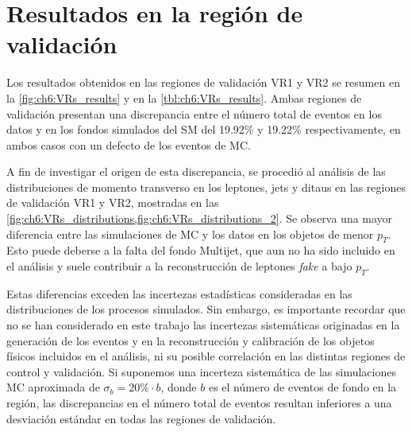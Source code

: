 \section{Resultados en la región de validación}

Los resultados obtenidos en las regiones de validación VR1 y VR2 se resumen en la \cref{fig:ch6:VRs_results} y en la \cref{tbl:ch6:VRs_results}. Ambas regiones de validación presentan una discrepancia entre el número total de eventos en los datos y en los fondos simulados del SM del 19.92\% y 19.22\% respectivamente, en ambos casos con un defecto de los eventos de MC.

A fin de investigar el origen de esta discrepancia, se procedió al análisis de las distribuciones de momento transverso en los leptones, jets y ditaus en las regiones de validación VR1 y VR2, mostradas en las \cref{fig:ch6:VRs_distributions,fig:ch6:VRs_distributions_2}. Se observa una mayor diferencia entre las simulaciones de MC y los datos en los objetos de menor $p_T$. Esto puede deberse a la falta del fondo Multijet, que aun no ha sido incluido en el análisis y suele contribuir a la reconstrucción de leptones \textit{fake} a bajo $p_T$.

Estas diferencias exceden las incertezas estadísticas consideradas en las distribuciones de los procesos simulados. Sin embargo, es importante recordar que no se han considerado en este trabajo las incertezas sistemáticas originadas en la generación de los eventos y en la reconstrucción y calibración de los objetos físicos incluidos en el análisis, ni su posible correlación en las distintas regiones de control y validación. Si suponemos una incerteza sistemática de las simulaciones MC aproximada de $\sigma_b = 20\% \cdot b$, donde $b$ es el número de eventos de fondo en la región, las discrepancias en el número total de eventos resultan inferiores a una desviación estándar en todas las regiones de validación.



